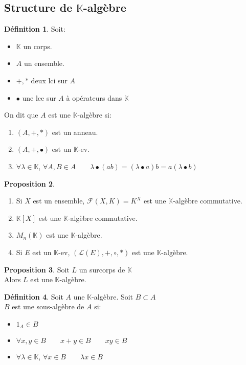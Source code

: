 \documentclass[10pt,a4paper]{article}
\theoremstyle{definition}
\newtheorem{proposition}{Proposition}[section]
\newtheorem{definition}[proposition]{Définition}
\begin{document}
\subsection{Structure de $\mathbb{K}$-algèbre}
\begin{definition}
Soit: \begin{itemize}
\item $\mathbb{K}$ un corps.
\item $A$ un ensemble.
\item $+, *$ deux lci sur $A$
\item $\bullet$ une lce sur $A$ à opérateurs dans $\mathbb{K}$
\end{itemize}
On dit que $A$ est une $\mathbb{K}$-algèbre si: 
\begin{enumerate}
\item $(A, +,  *)$ est un anneau.
\item $(A, +, \bullet)$ est un $\mathbb{K}$-ev.
\item $\forall \lambda \in \mathbb{K}$, $\forall A, B \in A \qquad \lambda \bullet (ab) = (\lambda \bullet a) b = a (\lambda \bullet b)$
\end{enumerate}
\end{definition}
\begin{proposition}
\hfill
\begin{enumerate}
\item Si $X$ est un ensemble, $\mathcal{F}(X, K) = K^X$ est une $\mathbb{K}$-algèbre commutative.
\item $\mathbb{K}[X]$ est une $\mathbb{K}$-algèbre commutative.
\item $M_n(\mathbb{K})$ est une $\mathbb{K}$-algèbre.
\item Si $E$ est un $\mathbb{K}$-ev, $(\mathcal{L}(E), +, \circ, *)$ est une $\mathbb{K}$-algèbre.
\end{enumerate}
\end{proposition}
\begin{proposition}
Soit $L$ un surcorps de $\mathbb{K}$ \\
Alors $L$ est une $\mathbb{K}$-algèbre.
\end{proposition}
\begin{definition}
Soit $A$ une $\mathbb{K}$-algèbre. Soit $B \subset A$ \\
$B$ est une sous-algèbre de $A$ si:
\begin{itemize}
\item $1_A \in B$
\item $\forall x, y \in B \qquad x + y \in B \qquad xy \in B$
\item $\forall \lambda \in \mathbb{K}$, $\forall x \in B \qquad \lambda x \in B$
\end{itemize}
\end{definition}
\end{document}
